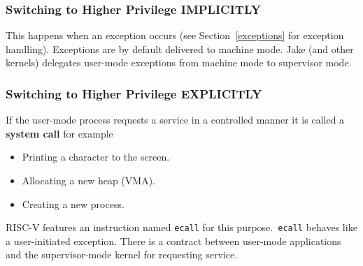 \subsubsection{Switching to Higher Privilege IMPLICITLY}

This happens when an exception occurs (see Section~\ref{exceptions} for exception handling). Exceptions are by default delivered to machine mode. Jake (and other kernels) delegates user-mode exceptions from machine mode to supervisor mode. 

\subsubsection{Switching to Higher Privilege EXPLICITLY}

If the user-mode process requests a service in a controlled manner it is called a \textbf{system call} for example
\begin{itemize}
    \item Printing a character to the screen.
    \item Allocating a new heap (VMA).
    \item Creating a new process.
\end{itemize}

RISC-V features an instruction named \texttt{ecall} for this purpose.\ \texttt{ecall} behaves like a user-initiated exception. There is a contract between user-mode applications and the supervisor-mode kernel for requesting service.
